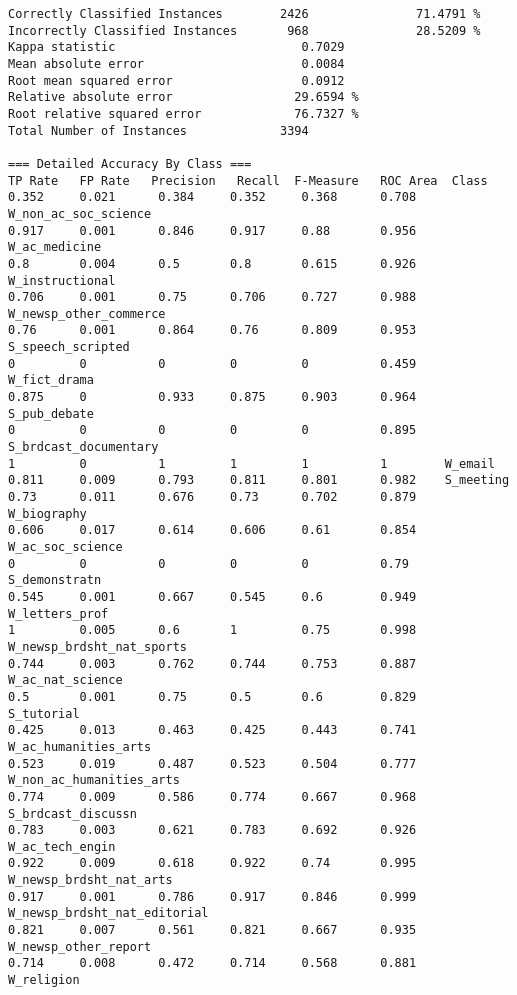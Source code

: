 

{\small
\begin{verbatim}
Correctly Classified Instances        2426               71.4791 %
Incorrectly Classified Instances       968               28.5209 %
Kappa statistic                          0.7029
Mean absolute error                      0.0084
Root mean squared error                  0.0912
Relative absolute error                 29.6594 %
Root relative squared error             76.7327 %
Total Number of Instances             3394     

=== Detailed Accuracy By Class ===
TP Rate   FP Rate   Precision   Recall  F-Measure   ROC Area  Class
0.352     0.021      0.384     0.352     0.368      0.708    W_non_ac_soc_science
0.917     0.001      0.846     0.917     0.88       0.956    W_ac_medicine
0.8       0.004      0.5       0.8       0.615      0.926    W_instructional
0.706     0.001      0.75      0.706     0.727      0.988    W_newsp_other_commerce
0.76      0.001      0.864     0.76      0.809      0.953    S_speech_scripted
0         0          0         0         0          0.459    W_fict_drama
0.875     0          0.933     0.875     0.903      0.964    S_pub_debate
0         0          0         0         0          0.895    S_brdcast_documentary
1         0          1         1         1          1        W_email
0.811     0.009      0.793     0.811     0.801      0.982    S_meeting
0.73      0.011      0.676     0.73      0.702      0.879    W_biography
0.606     0.017      0.614     0.606     0.61       0.854    W_ac_soc_science
0         0          0         0         0          0.79     S_demonstratn
0.545     0.001      0.667     0.545     0.6        0.949    W_letters_prof
1         0.005      0.6       1         0.75       0.998    W_newsp_brdsht_nat_sports
0.744     0.003      0.762     0.744     0.753      0.887    W_ac_nat_science
0.5       0.001      0.75      0.5       0.6        0.829    S_tutorial
0.425     0.013      0.463     0.425     0.443      0.741    W_ac_humanities_arts
0.523     0.019      0.487     0.523     0.504      0.777    W_non_ac_humanities_arts
0.774     0.009      0.586     0.774     0.667      0.968    S_brdcast_discussn
0.783     0.003      0.621     0.783     0.692      0.926    W_ac_tech_engin
0.922     0.009      0.618     0.922     0.74       0.995    W_newsp_brdsht_nat_arts
0.917     0.001      0.786     0.917     0.846      0.999    W_newsp_brdsht_nat_editorial
0.821     0.007      0.561     0.821     0.667      0.935    W_newsp_other_report
0.714     0.008      0.472     0.714     0.568      0.881    W_religion

\end{verbatim}}
